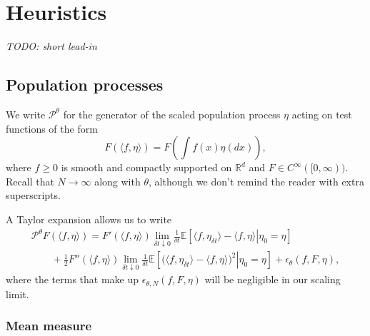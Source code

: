 \documentclass[12pt]{article}
\newcommand{\IE}{\mathbb E}
\newcommand{\IR}{\mathbb R}
\newcommand{\Pgen}{\mathcal{P}}    %
\newcommand{\comment}[1]{{\color{blue} \it #1}}
\begin{document}
\section{Heuristics}
    \label{sec:heuristics}

\comment{TODO: short lead-in}

\subsection{Population processes}
    \label{sec:population_heuristics}

We write $\Pgen^\theta$
for the generator of the scaled population process $\eta$ acting
on test functions of the form 
$$
    F( \langle f, \eta\rangle )
    =
    F \left( \int f(x)\eta(dx) \right),
$$
where $f \geq 0$ is smooth and compactly supported on $\IR^d$ and 
$F \in C^\infty ([0,\infty))$.
Recall that $N \to \infty$ along with $\theta$,
although we don't remind the reader with extra superscripts.


A Taylor expansion allows us to write
\begin{multline*}
    \Pgen^\theta
    F(\langle f,\eta \rangle)
    =
    F'(\langle f, \eta \rangle)
    \lim_{\delta t\downarrow 0} \frac{1}{\delta t}
    \IE\left[
        \left. \langle f, \eta_{\delta t} \rangle
        -
        \langle f, \eta \rangle
        \right| \eta_0=\eta
    \right]
    \\
    \qquad {}
    + \frac{1}{2}
        F''(\langle f,\eta\rangle)
    \lim_{\delta t\downarrow 0}\frac{1}{\delta t}
    \IE\left[
        \left.\big(\langle f,\eta_{\delta t}\rangle
        -
        \langle f, \eta\rangle\big)^2 \right|\eta_0=\eta
    \right]
    +
    \epsilon_{\theta}(f, F, \eta),
\end{multline*}
where the terms that make up 
$\epsilon_{\theta, N}(f, F, \eta)$
will be negligible in our scaling limit. 

\subsubsection*{Mean measure}
\end{document}
